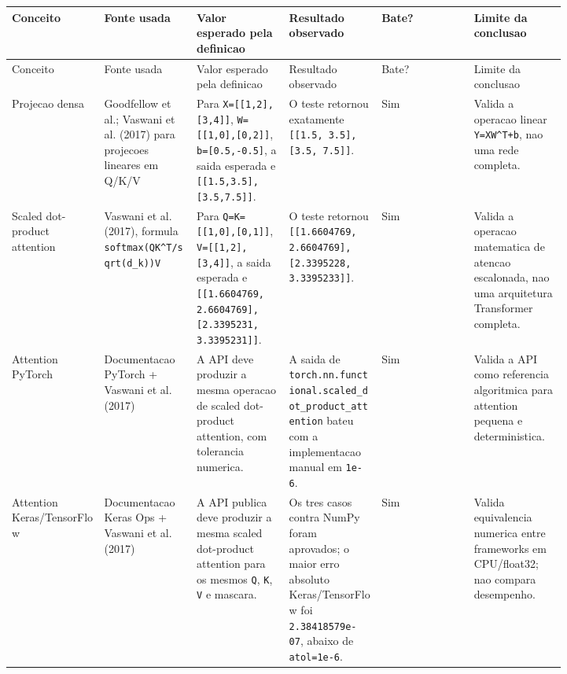 \begin{landscape}
\scriptsize
\begin{longtable}{@{}>{\RaggedRight\arraybackslash}p{0.137\linewidth}>{\RaggedRight\arraybackslash}p{0.137\linewidth}>{\RaggedRight\arraybackslash}p{0.137\linewidth}>{\RaggedRight\arraybackslash}p{0.137\linewidth}>{\RaggedRight\arraybackslash}p{0.137\linewidth}>{\RaggedRight\arraybackslash}p{0.137\linewidth}@{}}
\toprule
Conceito & Fonte usada & Valor esperado pela definicao & Resultado observado & Bate? & Limite da conclusao \\
\midrule
\endfirsthead
\toprule
Conceito & Fonte usada & Valor esperado pela definicao & Resultado observado & Bate? & Limite da conclusao \\
\midrule
\endhead
Projecao densa & Goodfellow et al.; Vaswani et al. (2017) para projecoes lineares em Q/K/V & Para \texttt{X=[[1,2],[3,4]]}, \texttt{W=[[1,0],[0,2]]}, \texttt{b=[0.\allowbreak{}5,-0.\allowbreak{}5]}, a saida esperada e \texttt{[[1.\allowbreak{}5,3.\allowbreak{}5],[3.\allowbreak{}5,7.\allowbreak{}5]]}. & O teste retornou exatamente \texttt{[[1.\allowbreak{}5, 3.\allowbreak{}5], [3.\allowbreak{}5, 7.\allowbreak{}5]]}. & Sim & Valida a operacao linear \texttt{Y=XW\textasciicircum{}T+b}, nao uma rede completa. \\
Scaled dot-product attention & Vaswani et al. (2017), formula \texttt{softmax(QK\textasciicircum{}T/\allowbreak{}sqrt(d\_\allowbreak{}k))V} & Para \texttt{Q=K=[[1,0],[0,1]]}, \texttt{V=[[1,2],[3,4]]}, a saida esperada e \texttt{[[1.\allowbreak{}6604769, 2.\allowbreak{}6604769], [2.\allowbreak{}3395231, 3.\allowbreak{}3395231]]}. & O teste retornou \texttt{[[1.\allowbreak{}6604769, 2.\allowbreak{}6604769], [2.\allowbreak{}3395228, 3.\allowbreak{}3395233]]}. & Sim & Valida a operacao matematica de atencao escalonada, nao uma arquitetura Transformer completa. \\
Attention PyTorch & Documentacao PyTorch + Vaswani et al. (2017) & A API deve produzir a mesma operacao de scaled dot-product attention, com tolerancia numerica. & A saida de \texttt{torch.\allowbreak{}nn.\allowbreak{}functional.\allowbreak{}scaled\_\allowbreak{}dot\_\allowbreak{}product\_\allowbreak{}attention} bateu com a implementacao manual em \texttt{1e-6}. & Sim & Valida a API como referencia algoritmica para attention pequena e deterministica. \\
Attention Keras/TensorFlow & Documentacao Keras Ops + Vaswani et al. (2017) & A API publica deve produzir a mesma scaled dot-product attention para os mesmos \texttt{Q}, \texttt{K}, \texttt{V} e mascara. & Os tres casos contra NumPy foram aprovados; o maior erro absoluto Keras/TensorFlow foi \texttt{2.\allowbreak{}38418579e-07}, abaixo de \texttt{atol=1e-6}. & Sim & Valida equivalencia numerica entre frameworks em CPU/float32; nao compara desempenho. \\

\end{longtable}
\end{landscape}
